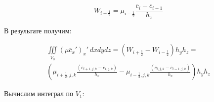 \documentclass[12pt]{article}
\begin{document}
\begin{equation*}
	W_{i-\frac{1}{2}} = \mu_{i-\frac{1}{2}} \frac{\bar{c}_{i} -\bar{c}_{i-1} }{h_{x}}	
\end{equation*}

В результате получим:

\begin{multline*} 
	\iiint\limits_{V_0} (\mu\bar{c}_x')_x'\,dxdydz = (W_{i+\frac{1}{2}} - W_{i-\frac{1}{2}})h_yh_z=  \\   \left(\mu_{i+\frac{1}{2},j,k}\frac{(\bar{c}_{i+1,j,k}- \bar{c}_{i,j,k})}{h_x} - \mu_{i-\frac{1}{2},j,k}\frac{(\bar{c}_{i,j,k}- \bar{c}_{i-1,j,k})}{h_x}\right)h_yh_z
\end{multline*} 

Вычислим интеграл по $V_1$:
\end{document}
